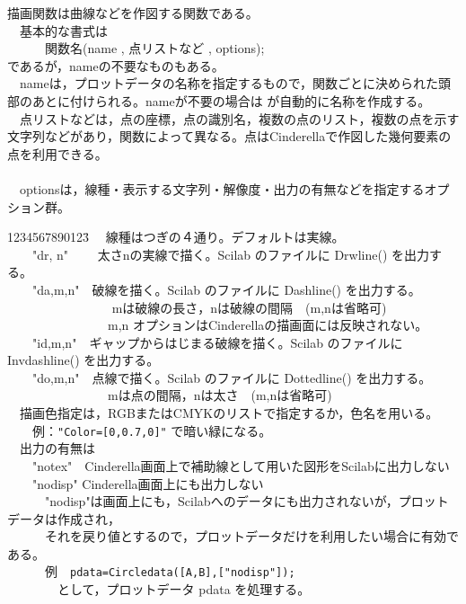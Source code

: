 \documentclass[papersize,a4paper,12pt,uplatex]{jsarticle}
\begin{document}
描画関数は曲線などを作図する関数である。\\
　基本的な書式は\\
　　　関数名(name , 点リストなど , options);\\
であるが，nameの不要なものもある。\\
　nameは，プロットデータの名称を指定するもので，関数ごとに決められた頭部のあとに付けられる。nameが不要の場合は \ketcindy が自動的に名称を作成する。\\
　点リストなどは，点の座標，点の識別名，複数の点のリスト，複数の点を示す文字列などがあり，関数によって異なる。点はCinderellaで作図した幾何要素の点を利用できる。\\
　\\
　optionsは，線種・表示する文字列・解像度・出力の有無などを指定するオプション群。
\begin{tabbing}
1234567890123\=\kill
　線種はつぎの４通り。デフォルトは実線。\\
　　"dr, n"　　 \>太さnの実線で描く。Scilab のファイルに Drwline() を出力する。\\
　　"da,m,n"　\>破線を描く。Scilab のファイルに Dashline() を出力する。\\
　　　　　　　　\> mは破線の長さ，nは破線の間隔　(m,nは省略可)\\
　　　　　　　　\>m,n オプションはCinderellaの描画面には反映されない。\\
　　"id,m,n"　\>ギャップからはじまる破線を描く。Scilab のファイルに Invdashline() を出力する。\\
　　"do,m,n"　\>点線で描く。Scilab のファイルに Dottedline() を出力する。\\
　　　　　　　　\>mは点の間隔，nは太さ　(m,nは省略可)\\
　描画色指定は，RGBまたはCMYKのリストで指定するか，色名を用いる。\\
　　例：\verb|"Color=[0,0.7,0]"| で暗い緑になる。\\
　出力の有無は\\
　　"notex"　\>Cinderella画面上で補助線として用いた図形をScilabに出力しない\\
　　"nodisp" \>Cinderella画面上にも出力しない\\

　　　"nodisp"は画面上にも，Scilabへのデータにも出力されないが，プロットデータは作成され，\\
　　　それを戻り値とするので，プロットデータだけを利用したい場合に有効である。\\
　　　例　\verb|pdata=Circledata([A,B],["nodisp"]);|\\
　　　　として，プロットデータ pdata を処理する。\\
\end{tabbing}
\end{document}
